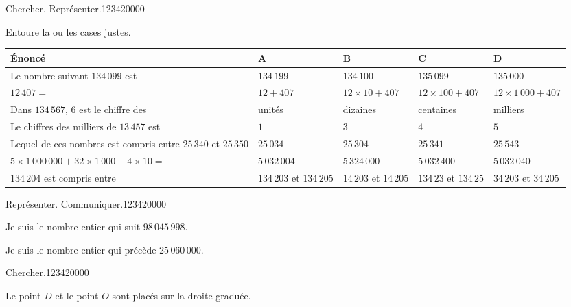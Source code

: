  
\begin{pageAuto}

\begin{ExoAuto}{Chercher. Représenter.}{1234}{2}{0}{0}{0}{0}

Entoure la ou les cases justes.

\begin{tabularx}{\linewidth}{|p{6cm}|X|X|X|X|}
\hline 
Énoncé & A & B & C & D \\ 
\hline
Le nombre suivant $134\,099$ est & $134\,199$ & $134\,100$ & $135\,099$ & $135\,000$ \\ 
\hline 
$12\,407=$ & $12+407$ &  $12\times 10+407$ &  $12\times 100+407$ & $12\times 1\,000+407$ \\ 
\hline 
Dans $134\,567$, $6$ est le chiffre des & unités &  dizaines & centaines & milliers \\ 
\hline 
Le chiffres des milliers de $13\,457$ est  & $1$ & $3$ & $4$ & $5$ \\ 
\hline 
Lequel de ces nombres est compris entre $25\,340$ et $25\,350 $ & $25\,034$ & $25\,304$ & $25\,341$ & $25\,543$ \\ 
\hline 
$5\times 1\,000\,000+32\times 1\,000 +4\times 10=$ & $5\,032\,004$ &  $5\,324\,000$ &  $5\,032\,400$ &  $5\,032\,040$ \\ 
\hline 
 $134\,204$ est compris entre & $134\,203$ et $134\,205$  & $14\,203$ et $14\,205$& $134\,23$ et $134\,25$ &  $34\,203$ et $34\,205$ \\ 
\hline

\end{tabularx} 
\end{ExoAuto}

 
 

\begin{ExoAuto}{Représenter. Communiquer.}{1234}{2}{0}{0}{0}{0}

Je suis le nombre entier qui suit  $98\,045\,998$. 

Je suis le nombre entier qui précède  $25\,060\,000$. 
  
\end{ExoAuto}
 
 
\begin{ExoAuto}{Chercher.}{1234}{2}{0}{0}{0}{0}

 Le point $D$ et le point $O$ sont placés sur la droite graduée.
 

\end{ExoAuto}
\end{pageAuto}
